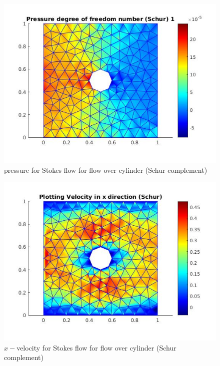 \documentclass[a4paper,12pt]{book}
\begin{document}
\begin{figure}
  \includegraphics[width=\linewidth]{pressure_Schur.jpg}
  \caption{pressure for Stokes flow for flow over cylinder (Schur complement)}
  \label{fig:pressure_cylinder_stokes_schur}
\end{figure}

\begin{figure}
  \includegraphics[width=\linewidth]{velocity_X_schur.jpg}
  \caption{$x-$velocity for Stokes flow for flow over cylinder (Schur complement)}
  \label{fig:velocity_x_cylinder_stokes_schur}
\end{figure}
\end{document}
